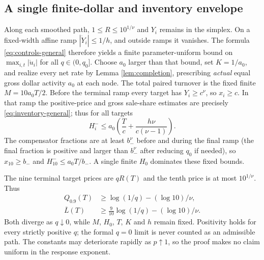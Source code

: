 \documentclass[review,hidelinks,onefignum,onetabnum]{siamonline250211}%
\begin{document}
\subsection{A single finite-dollar and inventory envelope}
\label{app:general-budget}
Along each smoothed path, $1\le R\le10^{1/\nu}$ and
$Y_i$ remains in the simplex. On a fixed-width affine
ramp $|\dot Y_i|\le1/h$, and outside ramps it vanishes.
The formula \eqref{eq:controls-general} therefore yields
a finite parameter-uniform bound on $\max_{i,t}|\dot u_i|$
for all $q\in(0,q_0]$. Choose $a_0$ larger than that bound,
set $K=1/a_0$, and realize every net rate by Lemma
\ref{lem:completion}, prescribing \emph{actual} equal gross
dollar activity $a_0$ at each node. The total paired turnover
is the fixed finite $M=10a_0T/2$.
Before the terminal ramp every target has $Y_i\ge c^\nu$,
so $x_i\ge c$. In that ramp the positive-price and gross
sale-share estimates are precisely
\eqref{eq:inventory-general}; thus for all targets
\[
 H_i^-\le a_0\left(\frac{T}{c}
                 +\frac{h\nu}{c(\nu-1)}\right).
\]
The compensator fractions are at least $b_-^\nu$ before
and during the final ramp (the final fraction is positive
and larger than $b_-^\nu$ after reducing $q_0$ if needed),
so $x_{10}\ge b_-$ and
$H_{10}^-\le a_0T/b_-$. A single finite
$H_0$ dominates these fixed bounds.

The nine terminal target prices are $qR(T)$ and the tenth
price is at most $10^{1/\nu}$. Thus
\begin{align*}
 Q_{0.9}(T)&\ge\log(1/q)-(\log10)/\nu,\\
 \overline L(T)&\ge\tfrac9{10}\log(1/q)
                              -(\log10)/\nu.
\end{align*}
Both diverge as $q\downarrow0$, while $M$, $H_0$, $T$,
$K$ and $h$ remain fixed. Positivity holds for every
strictly positive $q$; the formal $q=0$ limit is never
counted as an admissible path. The constants may deteriorate
rapidly as $p\uparrow1$, so the proof makes no claim uniform
in the response exponent.
\end{document}
